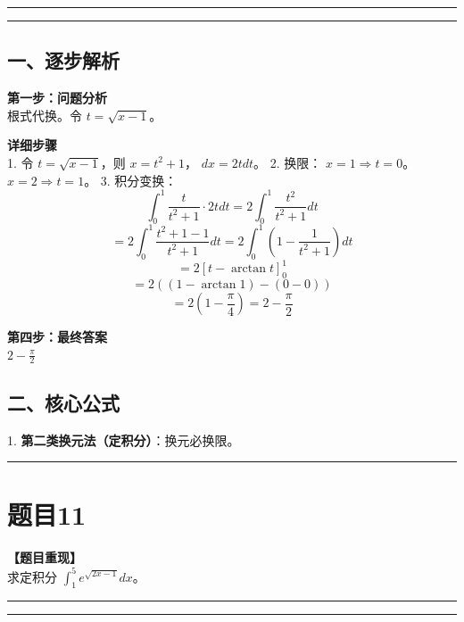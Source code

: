 \documentclass[12pt, a4paper]{ctexart}
\newcommand{\TopSeparator}{
    \par\noindent\rule{\textwidth}{1.5pt}\vspace{0.5em} %
}
\newcommand{\AnalysisSeparator}{
    \par\noindent\rule{\textwidth}{0.5pt}\vspace{0.2em}\hrule\vspace{0.5em} %
}
\newenvironment{RedAnalysis}{
    \par
    \color{red} %
}{
    \par
    \color{black} %
}
\begin{document}
\AnalysisSeparator

\begin{RedAnalysis}

\subsection*{一、逐步解析}

\textbf{第一步：问题分析} \\
根式代换。令 $t = \sqrt{x-1}$。

\textbf{详细步骤} \\
1. 令 $t = \sqrt{x-1}$，则 $x = t^2 + 1$， $dx = 2t dt$。
2. 换限：
   $x=1 \Rightarrow t=0$。
   $x=2 \Rightarrow t=1$。
3. 积分变换：
   \[ \int_0^1 \frac{t}{t^2+1} \cdot 2t dt = 2 \int_0^1 \frac{t^2}{t^2+1} dt \]
   \[ = 2 \int_0^1 \frac{t^2+1-1}{t^2+1} dt = 2 \int_0^1 (1 - \frac{1}{t^2+1}) dt \]
   \[ = 2 [ t - \arctan t ]_0^1 \]
   \[ = 2 ( (1 - \arctan 1) - (0 - 0) ) \]
   \[ = 2 (1 - \frac{\pi}{4}) = 2 - \frac{\pi}{2} \]

\textbf{第四步：最终答案} \\
$ 2 - \frac{\pi}{2} $

\subsection*{二、核心公式}
1. \textbf{第二类换元法（定积分）}：换元必换限。

\end{RedAnalysis}

\vspace{2em}

\TopSeparator
\section*{题目11}

\textbf{【题目重现】} \\
求定积分 $ \int_{1}^{5}e^{\sqrt{2x-1}}dx $。

\AnalysisSeparator
\end{document}
